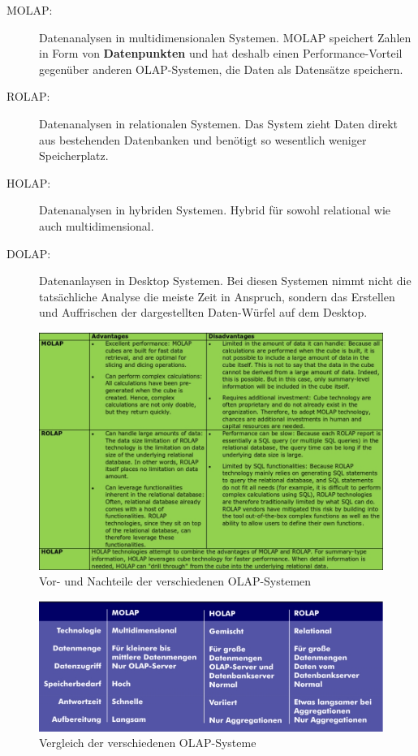 \documentclass[a4paper, 11pt, nofootinbib]{article}
\begin{document}
\begin{description}
	\item[MOLAP:] Datenanalysen in multidimensionalen Systemen. MOLAP speichert Zahlen in Form von \textbf{Datenpunkten} und hat deshalb einen Performance-Vorteil gegenüber anderen OLAP-Systemen, die Daten als Datensätze speichern.
	\item[ROLAP: ] Datenanalysen in relationalen Systemen. Das System zieht Daten direkt aus bestehenden Datenbanken und benötigt so wesentlich weniger Speicherplatz.
	\item[HOLAP: ] Datenanalysen in hybriden Systemen. Hybrid für sowohl relational wie auch multidimensional.
	\item[DOLAP: ] Datenanlaysen in Desktop Systemen. Bei diesen Systemen nimmt nicht die tatsächliche Analyse die meiste Zeit in Anspruch, sondern das Erstellen und Auffrischen der dargestellten Daten-Würfel auf dem Desktop.
\end{description}

\begin{figure}[htb!]
	\centering
	\includegraphics[keepaspectratio=true,height=20\baselineskip]{OLAP}
	\caption{Vor- und Nachteile der verschiedenen OLAP-Systemen}
	\label{fig:OLAP}
\end{figure}

\begin{figure}[htb!]
	\centering
	\includegraphics[keepaspectratio=true,height=11\baselineskip]{comp_OLAP.jpg}
	\caption{Vergleich der verschiedenen OLAP-Systeme}
	\label{fig:comp_OLAP}
\end{figure}
\end{document}
